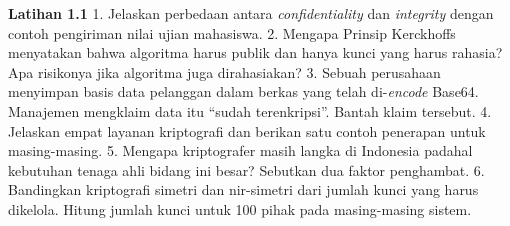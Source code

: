 \begin{obereflection}
\textbf{Latihan 1.1}
1. Jelaskan perbedaan antara \textit{confidentiality} dan \textit{integrity}
   dengan contoh pengiriman nilai ujian mahasiswa.
2. Mengapa Prinsip Kerckhoffs menyatakan bahwa algoritma harus publik dan hanya
   kunci yang harus rahasia? Apa risikonya jika algoritma juga dirahasiakan?
3. Sebuah perusahaan menyimpan basis data pelanggan dalam berkas yang telah
   di-\textit{encode} Base64. Manajemen mengklaim data itu ``sudah terenkripsi''.
   Bantah klaim tersebut.
4. Jelaskan empat layanan kriptografi dan berikan satu contoh penerapan untuk
   masing-masing.
5. Mengapa kriptografer masih langka di Indonesia padahal kebutuhan tenaga ahli
   bidang ini besar? Sebutkan dua faktor penghambat.
6. Bandingkan kriptografi simetri dan nir-simetri dari jumlah kunci yang harus
   dikelola. Hitung jumlah kunci untuk 100 pihak pada masing-masing sistem.
\end{obereflection}
